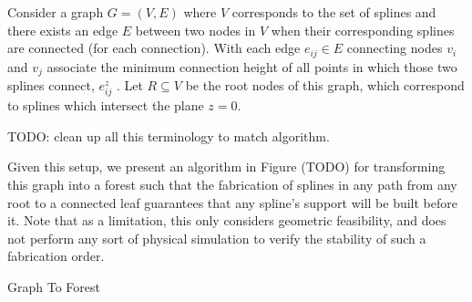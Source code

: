 \documentclass[conference]{acmsiggraph}
\makeatletter
\def\BState{\State\hskip-\ALG@thistlm}
\makeatother
\begin{document}
Consider a graph $G = (V, E)$ where $V$ corresponds to the set of splines and there exists an edge $E$ between two nodes in $V$ when their corresponding splines are connected (for each connection).  With each edge $e_{ij} \in E$ connecting nodes $v_i$ and $v_j$ associate the minimum connection height of all points in which those two splines connect, $e_{ij}^z$
.  Let $R \subseteq V$ be the root nodes of this graph, which correspond to splines which intersect the plane $z=0$.

TODO: clean up all this terminology to match algorithm.

Given this setup, we present an algorithm in Figure (TODO) for transforming this graph into a forest such that the fabrication of splines in any path from any root to a connected leaf guarantees that any spline's support will be built before it.  Note that as a limitation, this only considers geometric feasibility, and does not perform any sort of physical simulation to verify the stability of such a fabrication order.

\begin{algorithm}
\caption{Graph To Forest}\label{alg:graphtoforest}
\end{algorithm}
\end{document}
